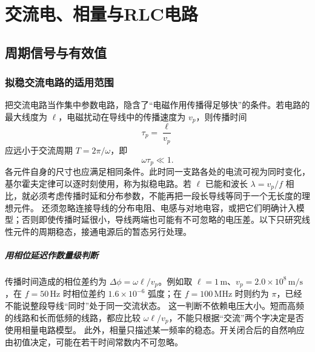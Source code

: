\begingroup
{}
\chapter{交流电、相量与RLC电路}

\section{周期信号与有效值}

\subsection{拟稳交流电路的适用范围}


把交流电路当作集中参数电路，隐含了“电磁作用传播得足够快”的条件。若电路的最大线度为 $\ell$，电磁扰动在导线中的传播速度为 $v_p$，则传播时间
\begin{equation}
 \tau_p=\frac{\ell}{v_p}
\end{equation}
应远小于交流周期 $T=2\pi/\omega$，即
\begin{equation}
 \omega\tau_p\ll1.
\end{equation}
各元件自身的尺寸也应满足相同条件。此时同一支路各处的电流可视为同时变化，基尔霍夫定律可以逐时刻使用，称为拟稳电路。若 $\ell$ 已能和波长 $\lambda=v_p/f$ 相比，就必须考虑传播时延和分布参数，不能再把一段长导线等同于一个无长度的理想元件。
还须忽略连接导线的分布电阻、电感与对地电容，或把它们明确计入模型；否则即使传播时延很小，导线两端也可能有不可忽略的电压差。以下只研究线性元件的周期稳态，接通电源后的暂态另行处理。


\paragraph{用相位延迟作数量级判断}
传播时间造成的相位差约为 $\Delta\phi=\omega\ell/v_p$。例如取 $\ell=1\,\mathrm m$、$v_p=2.0\times10^8\,\mathrm{m/s}$，在 $f=50\,\mathrm{Hz}$ 时相位差约 $1.6\times10^{-6}$ 弧度；在 $f=100\,\mathrm{MHz}$ 时则约为 $\pi$，已经不能说整段导线“同时”处于同一交流状态。
这一判断不依赖电压大小。短而高频的线路和长而低频的线路，都应比较 $\omega\ell/v_p$，不能只根据“交流”两个字决定是否使用相量电路模型。
此外，相量只描述某一频率的稳态。开关闭合后的自然响应由初值决定，可能在若干时间常数内不可忽略。


